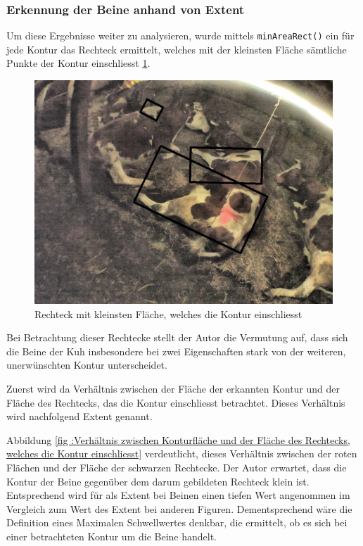 \subsubsection{Erkennung der Beine anhand von Extent}
Um diese Ergebnisse weiter zu analysieren, wurde mittels \texttt{minAreaRect()} ein für jede Kontur das Rechteck ermittelt, welches mit der kleinsten Fläche sämtliche Punkte der Kontur einschliesst \ref{fig: Rechteck mit kleinsten Fläche, welches die Kontur einschliesst}.  
\begin{figure}[H]
	\center
	\includegraphics[scale=0.43]{Grafiken/entwicklung/23ShapeAnalysis.jpg}
	\caption{Rechteck mit kleinsten Fläche, welches die Kontur einschliesst} 
	\label{fig: Rechteck mit kleinsten Fläche, welches die Kontur einschliesst} 
\end{figure}

Bei Betrachtung dieser Rechtecke stellt der Autor die Vermutung auf, dass sich die Beine der Kuh insbesondere bei zwei Eigenschaften stark von der weiteren, unerwünschten Kontur unterscheidet. 



Zuerst wird da Verhältnis zwischen der Fläche der erkannten Kontur und der Fläche des Rechtecks, das die Kontur einschliesst betrachtet. Dieses Verhältnis wird nachfolgend Extent genannt.


Abbildung \ref{fig :Verhältnis zwischen Konturfläche und der Fläche des Rechtecks, welches die Kontur einschliesst} verdeutlicht, dieses Verhältnis zwischen der roten Flächen und der Fläche der schwarzen Rechtecke.  Der Autor erwartet, dass die Kontur der Beine gegenüber dem darum gebildeten Rechteck klein ist. Entsprechend wird für als Extent bei Beinen einen tiefen Wert angenommen im Vergleich zum Wert des Extent bei anderen Figuren. Dementsprechend wäre die Definition eines Maximalen Schwellwertes denkbar, die ermittelt, ob es sich bei einer betrachteten Kontur um die Beine handelt. 



